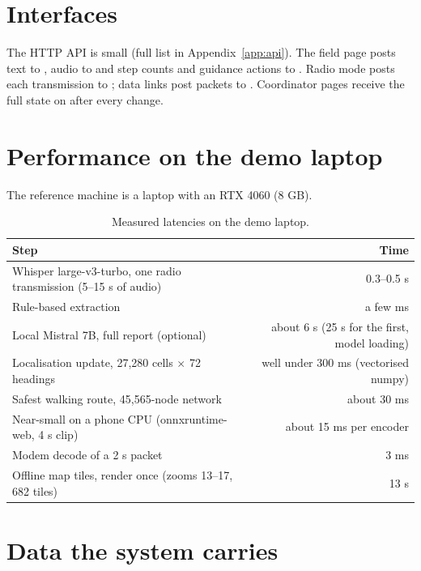 \section{Interfaces}

The HTTP API is small (full list in Appendix~\ref{app:api}). The field page posts text to
, audio to  and step counts and guidance actions to
. Radio mode posts each transmission to ; data links
post packets to . Coordinator pages receive the full state on  after every change.

\section{Performance on the demo laptop}

The reference machine is a laptop with an RTX 4060 (8 GB).

\begin{table}[htbp]\centering\small
\caption{Measured latencies on the demo laptop.}\label{tab:latency}
\begin{tabular}{lr}
\toprule
Step & Time\\
\midrule
Whisper large-v3-turbo, one radio transmission (5--15 s of audio) & 0.3--0.5 s\\
Rule-based extraction & a few ms\\
Local Mistral 7B, full report (optional) & about 6 s (25 s for the first, model loading)\\
Localisation update, 27,280 cells $\times$ 72 headings & well under 300 ms (vectorised numpy)\\
Safest walking route, 45,565-node network & about 30 ms\\
Near-small on a phone CPU (onnxruntime-web, 4 s clip) & about 15 ms per encoder\\
Modem decode of a 2 s packet & 3 ms\\
Offline map tiles, render once (zooms 13--17, 682 tiles) & 13 s\\
\bottomrule
\end{tabular}
\end{table}

\section{Data the system carries}

